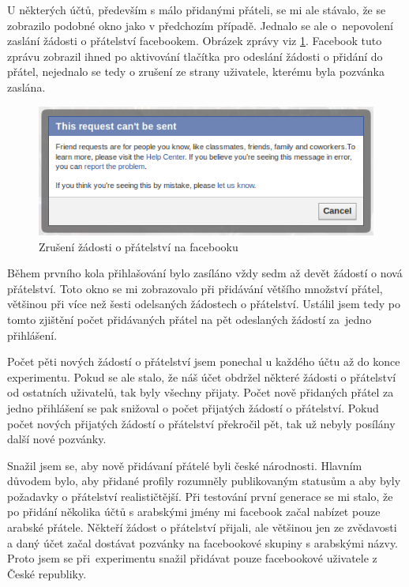\documentclass[thesis=M,czech]{FITthesis}[2013/05/10]
\begin{document}
U některých účtů, především s málo přidanými přáteli, se mi ale stávalo, že se zobrazilo podobné okno jako v předchozím případě. Jednalo se ale o~nepovolení zaslání žádosti o přátelství facebookem. Obrázek zprávy viz \ref{fig:cantFriend}. Facebook tuto zprávu zobrazil ihned po aktivování tlačítka pro odeslání žádosti o přidání do přátel, nejednalo se tedy o zrušení ze strany uživatele, kterému byla pozvánka zaslána.

\begin{figure}[h]
\begin{center}
\includegraphics[width=5in]{figures/cantFriend.png}
\caption{Zrušení žádosti o přátelství na facebooku}
\label{fig:cantFriend}
\end{center}
\end{figure}

Během prvního kola přihlašování bylo zasíláno vždy sedm až devět žádostí o nová přátelství. Toto okno se mi zobrazovalo při přidávání většího množství přátel, většinou při více než šesti odelsaných žádostech o přátelství. Ustálil jsem tedy po tomto zjištění počet přidávaných přátel na pět odeslaných žádostí za~jedno přihlášení.

Počet pěti nových žádostí o přátelství jsem ponechal u každého účtu až do konce experimentu. Pokud se ale stalo, že náš účet obdržel některé žádosti o přátelství od ostatních uživatelů, tak byly všechny přijaty. Počet nově přidaných přátel za jedno přihlášení se pak snižoval o počet přijatých žádostí o přátelství. Pokud počet nových přijatých žádostí o přátelství překročil pět, tak už nebyly posílány další nové pozvánky.

Snažil jsem se, aby nově přidávaní přátelé byli české národnosti. Hlavním důvodem bylo, aby přidané profily rozumněly publikovaným statusům a aby byly požadavky o přátelství realističtější. Při testování první generace se mi stalo, že po přidání několika účtů s arabskými jmény mi facebook začal nabízet pouze arabské přátele. Někteří žádost o přátelství přijali, ale většinou jen ze zvědavosti a daný účet začal dostávat pozvánky na facebookové skupiny s arabskými názvy. Proto jsem se při~experimentu snažil přidávat pouze facebookové uživatele z České republiky.
\end{document}
